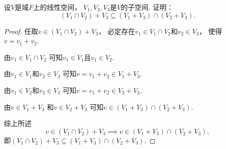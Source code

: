 \begin{example}
设\(V\)是域\(F\)上的线性空间，
\(V_1,V_2,V_3\)是\(V\)的子空间.
证明：\begin{equation}
	(V_1 \cap V_2) + V_3 \subseteq (V_1 + V_3) \cap (V_2 + V_3).
\end{equation}
\begin{proof}
任取\(v \in (V_1 \cap V_2) + V_3\)，
必定存在\(v_1 \in V_1 \cap V_2\)和\(v_2 \in V_3\)，
使得\(v = v_1 + v_2\).

由\(v_1 \in V_1 \cap V_2\)
可知\(v_1 \in V_1\)且\(v_1 \in V_2\).

由\(v_1 \in V_1\)和\(v_2 \in V_3\)
可知\(v = v_1 + v_2 \in V_1 + V_3\).

由\(v_1 \in V_2\)和\(v_2 \in V_3\)
可知\(v = v_1 + v_2 \in V_2 + V_3\).

由\(v \in V_1 + V_3\)
和\(v \in V_2 + V_3\)
可知\(v \in (V_1 + V_3) \cap (V_2 + V_3)\).

综上所述\[
	v \in (V_1 \cap V_2) + V_3
	\implies
	v \in (V_1 + V_3) \cap (V_2 + V_3),
\]
即\((V_1 \cap V_2) + V_3 \subseteq (V_1 + V_3) \cap (V_2 + V_3)\).
\end{proof}
\end{example}


